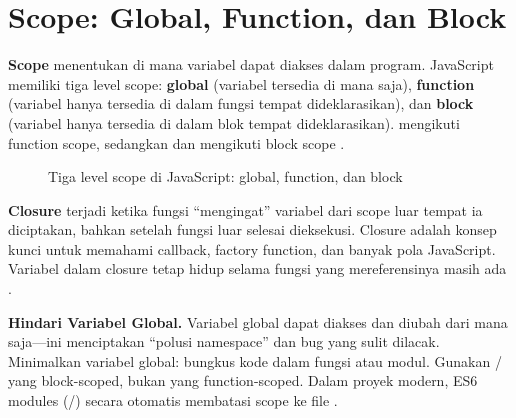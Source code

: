 \section{Scope: Global, Function, dan Block}

\textbf{Scope} menentukan di mana variabel dapat diakses dalam program. JavaScript memiliki tiga level scope: \textbf{global} (variabel tersedia di mana saja), \textbf{function} (variabel hanya tersedia di dalam fungsi tempat dideklarasikan), dan \textbf{block} (variabel hanya tersedia di dalam blok \code{\{ \}} tempat dideklarasikan).  mengikuti function scope, sedangkan  dan  mengikuti block scope \cite{jsInfo}.

\begin{figure}[htbp]
\centering
{}
\caption{Tiga level scope di JavaScript: global, function, dan block}
\end{figure}

\textbf{Closure} terjadi ketika fungsi ``mengingat'' variabel dari scope luar tempat ia diciptakan, bahkan setelah fungsi luar selesai dieksekusi. Closure adalah konsep kunci untuk memahami callback, factory function, dan banyak pola JavaScript. Variabel dalam closure tetap hidup selama fungsi yang mereferensinya masih ada \cite{mdnJsGuide}.

\begin{konsep}
\textbf{Hindari Variabel Global.} Variabel global dapat diakses dan diubah dari mana saja---ini menciptakan ``polusi namespace'' dan bug yang sulit dilacak. Minimalkan variabel global: bungkus kode dalam fungsi atau modul. Gunakan / yang block-scoped, bukan  yang function-scoped. Dalam proyek modern, ES6 modules (/) secara otomatis membatasi scope ke file \cite{jsInfo}.
\end{konsep}

